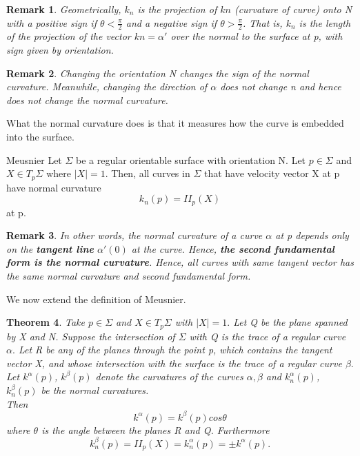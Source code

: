 \documentclass[twoside]{article}
\newcounter{lecnum}
\newtheorem{theorem}{Theorem}[lecnum]
\newtheorem{remark}[theorem]{Remark}
\begin{document}
\begin{remark}Geometrically, $k_n$ is the projection of $kn$ (curvature of curve) onto N with a positive sign if $\theta < \frac{\pi}{2}$ and a negative sign if $\theta > \frac{\pi}{2}$. That is, $k_n$ is the length of the projection of the vector $kn = \alpha'$ over the normal to the surface at p, with sign given by orientation.
\end{remark}

\begin{remark}Changing the orientation N changes the sign of the normal curvature. Meanwhile, changing the direction of $\alpha$ does not change n and hence does not change the normal curvature.
\end{remark}

What the normal curvature does is that it measures how the curve is embedded into the surface.

\begin{proposition_exam}{Meusnier}{} Let $\Sigma$ be a regular orientable surface with orientation N. Let $p \in \Sigma$ and $X \in T_p\Sigma$ where $|X| = 1.$ Then, all curves in $\Sigma$ that have velocity vector X at p have normal curvature $$k_n(p) = II_p(X)$$ at p.
\end{proposition_exam}

\begin{remark}In other words, the normal curvature of a curve $\alpha$ at p depends only on the \textbf{tangent line} $\alpha'(0)$ at the curve. Hence, \textbf{the second fundamental form is the normal curvature}. Hence, all curves with same tangent vector has the same normal curvature and second fundamental form.
\end{remark}

We now extend the definition of Meusnier.

\begin{theorem}Take $p \in \Sigma$ and $X \in T_p\Sigma$ with $|X| = 1.$ Let Q be the plane spanned by X and N. Suppose the intersection of $\Sigma$ with Q is the trace of a regular curve $\alpha.$ Let R be any of the planes through the point p, which contains the tangent vector X, and whose intersection with the surface is the trace of a regular curve $\beta.$\\
Let $k^{\alpha}(p)$, $k^{\beta}(p)$ denote the curvatures of the curves $\alpha, \beta$ and $k_n^{\alpha}(p)$, $k_n^{\beta}(p)$ be the normal curvatures.\\
Then
$$
k^{\alpha}(p) = k^{\beta}(p)cos\theta
$$
where $\theta$ is the angle between the planes R and Q. Furthermore 
$$
k_n^{\beta}(p) = II_p(X) = k_n^{\alpha}(p) = \pm k^{\alpha}(p).
$$
\end{theorem}
\end{document}
